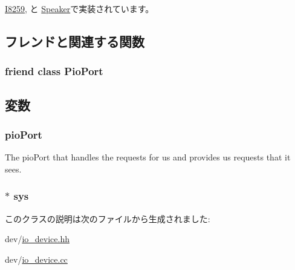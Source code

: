 \hyperlink{classX86ISA_1_1I8259_a4cefab464e72b5dd42c003a0a4341802}{I8259}, と \hyperlink{classX86ISA_1_1Speaker_a4cefab464e72b5dd42c003a0a4341802}{Speaker}で実装されています。

\subsection{フレンドと関連する関数}
\hypertarget{classPioDevice_a943f3d8eaf2e9b90571c1f8d4ec74b98}{
\subsubsection[{PioPort}]{\setlength{\rightskip}{0pt plus 5cm}friend class {\bf PioPort}}}
\label{classPioDevice_a943f3d8eaf2e9b90571c1f8d4ec74b98}


\subsection{変数}
\hypertarget{classPioDevice_a13e5e3439c77b7b772e2e11df33fd700}{
\subsubsection[{pioPort}]{ {\bf pioPort}}}
\label{classPioDevice_a13e5e3439c77b7b772e2e11df33fd700}
The pioPort that handles the requests for us and provides us requests that it sees. \hypertarget{classPioDevice_a8ae37465ba84acfef6af3e9b9e6dbbd5}{
\subsubsection[{sys}]{$\ast$ {\bf sys}}}
\label{classPioDevice_a8ae37465ba84acfef6af3e9b9e6dbbd5}


このクラスの説明は次のファイルから生成されました:\begin{DoxyCompactItemize}
\item 
dev/\hyperlink{io__device_8hh}{io\_\-device.hh}\item 
dev/\hyperlink{io__device_8cc}{io\_\-device.cc}\end{DoxyCompactItemize}
